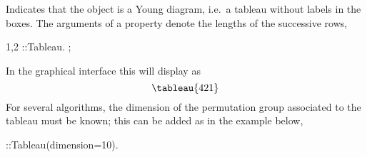 
Indicates that the object is a Young
  diagram, i.e.~a tableau without labels in the boxes. The arguments
  of a  property denote the lengths of the
  successive rows,
\begin{screen}{1,2}
\tab{#}::Tableau.
;
\end{screen}
In the graphical interface this will display as
\begin{equation*}
\tableau{4 2 1}
\end{equation*}
For several algorithms, the dimension of the permutation group
associated to the tableau must be known; this can be added as in the
example below,
\begin{screen}{1}
\tab{#}::Tableau(dimension=10).
\end{screen}
~
